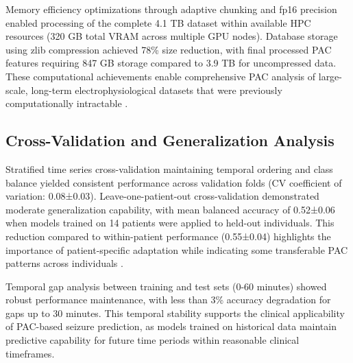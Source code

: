 	Memory efficiency optimizations through adaptive chunking and fp16 precision enabled processing of the complete 4.1 TB dataset within available HPC resources (320 GB total VRAM across multiple GPU nodes). Database storage using zlib compression achieved 78\% size reduction, with final processed PAC features requiring 847 GB storage compared to 3.9 TB for uncompressed data. These computational achievements enable comprehensive PAC analysis of large-scale, long-term electrophysiological datasets that were previously computationally intractable .

\subsection{Cross-Validation and Generalization Analysis}
Stratified time series cross-validation maintaining temporal ordering and class balance yielded consistent performance across validation folds (CV coefficient of variation: 0.08±0.03). Leave-one-patient-out cross-validation demonstrated moderate generalization capability, with mean balanced accuracy of 0.52±0.06 when models trained on 14 patients were applied to held-out individuals. This reduction compared to within-patient performance (0.55±0.04) highlights the importance of patient-specific adaptation while indicating some transferable PAC patterns across individuals .

	Temporal gap analysis between training and test sets (0-60 minutes) showed robust performance maintenance, with less than 3\% accuracy degradation for gaps up to 30 minutes. This temporal stability supports the clinical applicability of PAC-based seizure prediction, as models trained on historical data maintain predictive capability for future time periods within reasonable clinical timeframes.


\label{sec:results}

